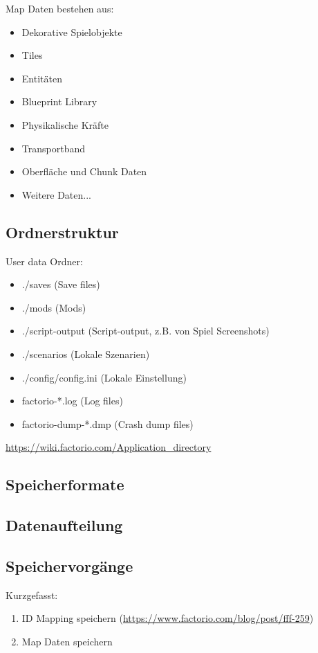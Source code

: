 Map Daten bestehen aus:
\begin{itemize}
    \item Dekorative Spielobjekte 
    \item Tiles 
    \item Entitäten
    \item Blueprint Library
    \item Physikalische Kräfte
    \item Transportband
    \item Oberfläche und Chunk Daten
    \item Weitere Daten...
\end{itemize}

\subsection{Ordnerstruktur}
User data Ordner:
\begin{itemize}
    \item ./saves (Save files)
    \item ./mods (Mods)
    \item ./script-output (Script-output, z.B. von Spiel Screenshots)
    \item ./scenarios (Lokale Szenarien)
    \item ./config/config.ini (Lokale Einstellung)
    \item factorio-*.log (Log files)
    \item factorio-dump-*.dmp (Crash dump files)
\end{itemize}

\url{https://wiki.factorio.com/Application_directory} %

\subsection{Speicherformate}

\subsection{Datenaufteilung}

\subsection{Speichervorgänge}
Kurzgefasst:
\begin{enumerate}
    \item ID Mapping speichern (\url{https://www.factorio.com/blog/post/fff-259}) %
    \item Map Daten speichern
\end{enumerate}

